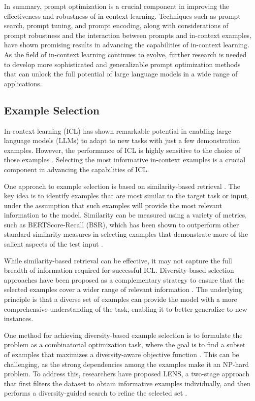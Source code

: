 \documentclass[11pt]{article}
\begin{document}
In summary, prompt optimization is a crucial component in improving the effectiveness and robustness of in-context learning. Techniques such as prompt search, prompt tuning, and prompt encoding, along with considerations of prompt robustness and the interaction between prompts and in-context examples, have shown promising results in advancing the capabilities of in-context learning. As the field of in-context learning continues to evolve, further research is needed to develop more sophisticated and generalizable prompt optimization methods that can unlock the full potential of large language models in a wide range of applications.

\subsection{Example Selection}

In-context learning (ICL) has shown remarkable potential in enabling large language models (LLMs) to adapt to new tasks with just a few demonstration examples. However, the performance of ICL is highly sensitive to the choice of those examples \cite{ref72,ref73}. Selecting the most informative in-context examples is a crucial component in advancing the capabilities of ICL.

One approach to example selection is based on similarity-based retrieval \cite{ref73}. The key idea is to identify examples that are most similar to the target task or input, under the assumption that such examples will provide the most relevant information to the model. Similarity can be measured using a variety of metrics, such as BERTScore-Recall (BSR), which has been shown to outperform other standard similarity measures in selecting examples that demonstrate more of the salient aspects of the test input \cite{ref73}.

While similarity-based retrieval can be effective, it may not capture the full breadth of information required for successful ICL. Diversity-based selection approaches have been proposed as a complementary strategy to ensure that the selected examples cover a wider range of relevant information \cite{ref72,ref74}. The underlying principle is that a diverse set of examples can provide the model with a more comprehensive understanding of the task, enabling it to better generalize to new instances.

One method for achieving diversity-based example selection is to formulate the problem as a combinatorial optimization task, where the goal is to find a subset of examples that maximizes a diversity-aware objective function \cite{ref72}. This can be challenging, as the strong dependencies among the examples make it an NP-hard problem. To address this, researchers have proposed LENS, a two-stage approach that first filters the dataset to obtain informative examples individually, and then performs a diversity-guided search to refine the selected set \cite{ref72}.
\end{document}
